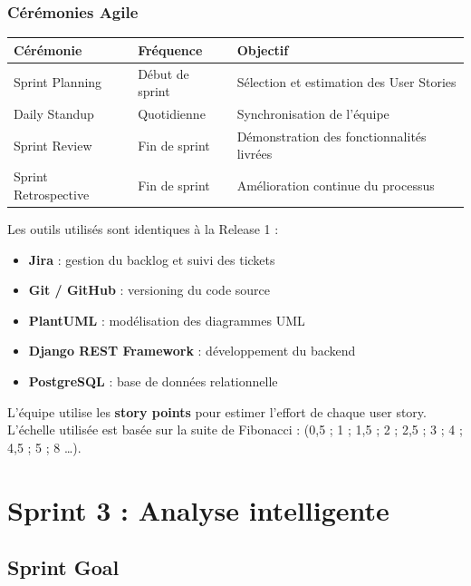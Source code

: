 \documentclass[a4paper,12pt]{report}
\begin{document}
\subsubsection{Cérémonies Agile}

\begin{tabular}{|l|l|l|}
\hline
\textbf{Cérémonie} & \textbf{Fréquence} & \textbf{Objectif} \\
\hline
Sprint Planning & Début de sprint & Sélection et estimation des User Stories \\
Daily Standup & Quotidienne & Synchronisation de l'équipe \\
Sprint Review & Fin de sprint & Démonstration des fonctionnalités livrées \\
Sprint Retrospective & Fin de sprint & Amélioration continue du processus \\
\hline
\end{tabular}

Les outils utilisés sont identiques à la Release 1 :
\begin{itemize}
    \item \textbf{Jira} : gestion du backlog et suivi des tickets
    \item \textbf{Git / GitHub} : versioning du code source
    \item \textbf{PlantUML} : modélisation des diagrammes UML
    \item \textbf{Django REST Framework}\cite{djangorestframework} : développement du backend
    \item \textbf{PostgreSQL} : base de données relationnelle
\end{itemize}

L'équipe utilise les \textbf{story points} pour estimer l'effort de chaque user story. L'échelle utilisée est basée sur la suite de Fibonacci : 
(0,5 ; 1 ; 1,5 ; 2 ; 2,5 ; 3 ; 4 ; 4,5 ; 5 ; 8 \dots).

 
\section{Sprint 3 : Analyse intelligente}
 
\subsection{Sprint Goal}
 
\end{document}
